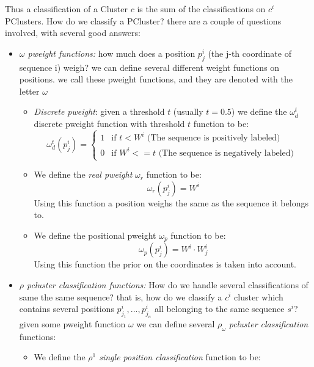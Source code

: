 \documentclass{amsart}
\theoremstyle{definition}
\theoremstyle{remark}
\theoremstyle{definition}
\theoremstyle{remark}
\begin{document}
Thus a classification of a Cluster $c$ is the sum of the classifications on $c^i$ PClusters.
How do we classify a PCluster? there are a couple of questions involved, with several good answers:
\begin{itemize}
	\item 	\emph{$\omega$ pweight functions:}
				how much does a position $p^i_j$ (the j-th coordinate of sequence i) weigh? 
				we can define several different weight functions on positions. we call these
				pweight functions, and they are denoted with the letter $\omega$
				\begin{itemize}
				\item		\emph{Discrete pweight}: given a threshold $t$ (usually $t = 0.5$) 
							we define the $\omega^t_d$ discrete pweight function with threshold $t$ function to be:
							\begin{equation*}
								\omega^t_d (p^i_j) = \begin{cases}
																1 & \text{if $t < W^i$ (The sequence is positively labeled) } \\
																0 & \text{if $W^i <= t$ (The sequence is negatively labeled) } 
															\end{cases}
							\end{equation*}		
		\item		We define the \emph{real pweight} $\omega_r$ function to be:
					\begin{equation*}
						\omega_r (p^i_j) = W^i
					\end{equation*}			
					Using this function a position weighs the same as the sequence it belongs to.
		\item 	We define the positional pweight $\omega_p$ function to be: 
					\begin{equation*}
						\omega_p (p^i_j) = W^i \cdot W^i_j
					\end{equation*}
					Using this function the prior on the coordinates is taken into account.
		\end{itemize}
	\item 	\emph{$\rho$ pcluster classification functions:}
				How do we handle several classifications of same the same sequence?
				that is, how do we classify a $c^i$ cluster which contains
				several positions $p^i_{j_1}, ..., p^i_{j_n}$ all belonging to the same sequence $s^i$?
				given some pweight function $\omega$ we can define several 
				$\rho_{\omega}$ \emph{pcluster classification} functions:
				\begin{itemize}
					\item	We define the \emph{$\rho^1$ single position classification} function to be: 

\end{itemize}
\end{itemize}
\end{document}
